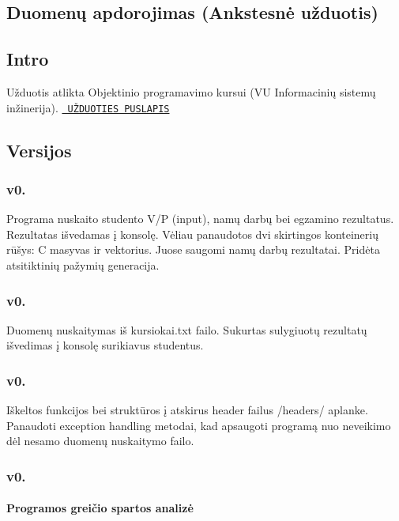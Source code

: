 \subsection*{Duomenų apdorojimas (Ankstesnė užduotis)}

\subsection*{Intro}

Užduotis atlikta Objektinio programavimo kursui (VU Informacinių sistemų inžinerija). \href{https://github.com/objprog/paskaitos2019/wiki/2-oji-u%C5%BEduotis}{\texttt{ UŽ\+D\+U\+O\+T\+I\+ES P\+U\+S\+L\+A\+P\+IS}}

\subsection*{Versijos}

\subsubsection*{v0.}

Programa nuskaito studento V/P (input), namų darbų bei egzamino rezultatus. Rezultatas išvedamas į konsolę. Vėliau panaudotos dvi skirtingos konteinerių rūšys\+: C masyvas ir vektorius. Juose saugomi namų darbų rezultatai. Pridėta atsitiktinių pažymių generacija.

\subsubsection*{v0.}

Duomenų nuskaitymas iš {\ttfamily kursiokai.\+txt} failo. Sukurtas sulygiuotų rezultatų išvedimas į konsolę surikiavus studentus.

\subsubsection*{v0.}

Iškeltos funkcijos bei struktūros į atskirus header failus {\ttfamily /headers/} aplanke. Panaudoti {\ttfamily exception handling} metodai, kad apsaugoti programą nuo neveikimo dėl nesamo duomenų nuskaitymo failo.

\subsubsection*{v0.}

\paragraph*{Programos greičio spartos analizė}



